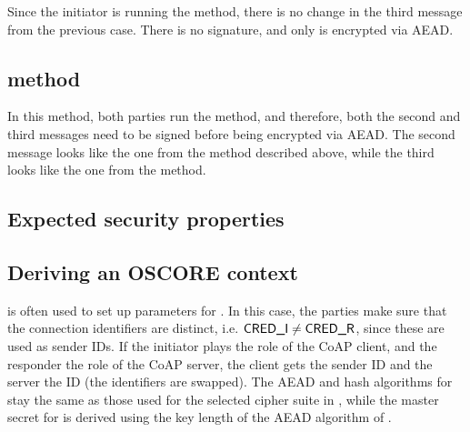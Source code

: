 Since the initiator is running the \mStat method, there is no change in the third message from the previous case. There is no signature, and only \mMacthree is encrypted via AEAD.

\subsection{\mSigSig method}
In this method, both parties run the \mSig method, and therefore, both the second and third messages need to be signed before being encrypted via AEAD. The second message looks like the one from the \mSigStat method described above, while the third looks like the one from the \mStatSig method.




\subsection{Expected security properties}

\subsection{Deriving an OSCORE context}
\mEdhoc is often used to set up parameters for \mOscore. In this case, the parties make sure that the connection identifiers are distinct, i.e. $\text{\textup{\textsf{CRED\_I}}} \neq \text{\textup{\textsf{CRED\_R}}}$, since these are used as \mOscore sender IDs. If the initiator plays the role of the CoAP client, and the responder the role of the CoAP server, the client gets the sender ID \mCredr and the server the ID \mCredi (the identifiers are swapped). The AEAD and hash algorithms for \mOscore stay the same as those used for the selected cipher suite in \mEdhoc, while the master secret for \mOscore is derived using the key length of the AEAD algorithm of \mEdhoc. 



